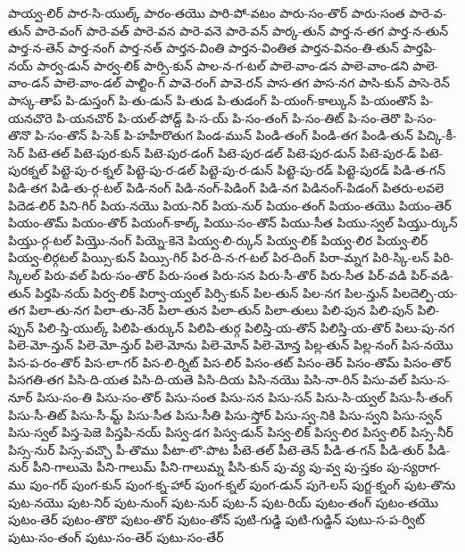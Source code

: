 {పాయ్వ-లిర్
పార-సి-యుల్క్
పారం-తయొ
పారి-పో-వటం
పారు-సం-తొర్
పారు-సంత
పారె-వ-తున్
పారె-వంగ్
పారె-వత్
పారె-వన
పారె-వనె
పారె-వన్
పార్క-తున్
పార్త-న-తగ
పార్త-న-తున్
పార్త-న-తెన్
పార్త-నంగ్
పార్త-నత్
పార్తన-వింతి
పార్తన-వింతిత
పార్తన-వినం-తి-తున్
పార్తపి-నయ్
పార్వ-డున్
పార్వ-లిక్
పార్సి-కున్
పాల-న-గ-టల్
పాలె-వాం-డన
పాలె-వాం-డని
పాలె-వాం-డన్
పాలె-వాం-డల్
పాల్టిం-గ్
పావె-రంగ్
పావె-రన్
పాస-తగ
పాస-నగ
పాసి-కున్
పాసె-రెన్
పాస్క-తాప్
పి-డుస్తంగ్
పి-తు-డున్
పి-తుడ
పి-తుడంగ్
పి-యంగ్-కాల్కున్
పి-యంతొన్
పి-యనచొరె
పి-యనచొర్
పి-యల్-పోడ్ద్
పి-స-య్
పి-సం-తంగ్
పి-సం-తిట్
పి-సం-తెరొ
పి-సం-తొనొ
పి-సం-తొన్
పి-సెక్
పి-హహీరొతుగ
పిండ-మున్
పిండి-తంగ్
పిండి-తగ
పిండి-తున్
పిచ్కి-కీ-సెర్
పిటె-తల్
పిటె-పుర-కున్
పిటె-పుర-డంగ్
పిటె-పుర-డల్
పిటె-పుర-డున్
పిటె-పుర-డ్
పిటె-పురక్నల్
పిట్టె-పు-ర-క్నల్
పిట్టె-పు-ర-డల్
పిట్టె-పు-ర-డున్
పిట్టె-పు-రడ్
పిట్టె-పురడ్
పిడి-త-గన్
పిడి-తగ
పిడి-తు-ర్గ-టల్
పిడి-నంగ్
పిడి-నంగ్-పిడింగ్
పిడి-నగ
పిడినంగ్-పిడంగ్
పితరు-లవలె
పిదెడ-లిర్
పిని-గిర్
పియ-నయొ
పియ-నిర్
పియ-నుర్
పియం-తంగ్
పియం-తయొ
పియం-తెర్
పియం-తొమ్
పియం-తొర్
పియంగ్-కాల్క్
పియు-సం-తొన్
పియు-సీత
పియు-స్వల్
పియ్తు-ర్కున్
పియ్తు-ర్గ-టల్
పియ్తొ-నంగ్
పియ్నె-కెనె
పియ్వ-లి-ర్కున్
పియ్వ-లిక్
పియ్వ-లిర
పియ్వ-లిర్
పియ్వ-లిర్గటల్
పియ్సి-కున్
పియ్సి-గిర్
పిర-ది-న-గ-టల్
పిర-దింగ్
పిరా-మ్నగ
పిరి-స్కి-లన్
పిరి-స్కిలల్
పిరు-వల్
పిరు-సం-తొర్
పిరు-సంత
పిరు-సన
పిరు-సీ-తొర్
పిరు-సీత
పిర్-వడి
పిర్-వడి-తున్
పిర్తపి-నయ్
పిర్వ-లిక్
పిర్వా-య్వల్
పిర్సి-కున్
పిల-తున్
పిల-నగ
పిల-న్తున్
పిలదెల్పి-య-తగ
పిలా-తు-నగ
పిలా-తు-నెర్
పిలా-తున
పిలా-తున్
పిలా-తులు
పిలి-పున
పిలి-పున్
పిలి-ప్పున్
పిలి-స్తి-యుల్క్
పిలిపి-తుర్కున్
పిలిపి-తుర్గ
పిలిస్తి-య-తొన్
పిలిస్తి-య-తొర్
పిలు-పు-నగ
పిలె-మో-న్తున్
పిలె-మో-న్తుర్
పిలె-మోను
పిలె-మోన్
పిలె-మోన్త
పిల్ల-తున్
పిల్ల-నంగ్
పిస-నయొ
పిస-ప-రం-తొర్
పిస-లా-గర్
పిస-లి-ర్నిట్
పిస-లిర్
పిసం-తట్
పిసం-తెర్
పిసం-తొమ్
పిసం-తొర్
పిసగతి-తగ
పిసి-ది-యత
పిసి-ది-యతె
పిసి-దియ
పిసి-నయొ
పిసి-నా-రిన్
పిసు-వల్
పిసు-స-నూర్
పిసు-సం-తి
పిసు-సం-తొర్
పిసు-సంత
పిసు-సన
పిసు-సన్
పిసు-సి-య్వల్
పిసు-సీ-తంగ్
పిసు-సీ-తిట్
పిసు-సీ-మ్ట్
పిసు-సీత
పిసు-సీతి
పిసు-స్తోర్
పిసు-స్వ-నికి
పిసు-స్వని
పిసు-స్వన్
పిసు-స్వల్
పిస్త-పెజె
పిస్తపి-నయ్
పిస్వ-డగ
పిస్వ-డున్
పిస్వ-లిక్
పిస్వ-లిర
పిస్వ-లిర్
పిస్స-నీర్
పిస్స-నుర్
పిస్స-వచ్చొ
పీ-తొము
పీటా-లొ-పొట
పీటె-తల్
పీటె-తెన్
పీడి-త-గన్
పీడి-తుర్
పీడి-నుర్
పీని-గాలుమె
పీని-గాలుమ్
పీని-గాలుమ్న
పీసి-కున్
పు-వ్య
పు-వ్వ
పు-స్తకం
పు-స్యరాగ-ము
పుం-గర్
పుంగ-కున్
పుంగ-క్న-హార్
పుంగ-క్నల్
పుంగ-డున్
పుగె-లస్
పుగ్ఙ-క్నంగ్
పుట-తొను
పుట-నయొ
పుట-నిర్
పుట-నుంగ్
పుట-నుర్
పుట-న్
పుట-రియ్
పుటం-తంగ్
పుటం-తయొ
పుటం-తెర్
పుటం-తొరొ
పుటం-తొర్
పుటం-తోన్
పుటి-గుడ్డి
పుటి-గుడ్డిన్
పుటు-స-ప-ర్విట్
పుటు-సం-తంగ్
పుటు-సం-తెర్
పుటు-సం-తేర్
}
